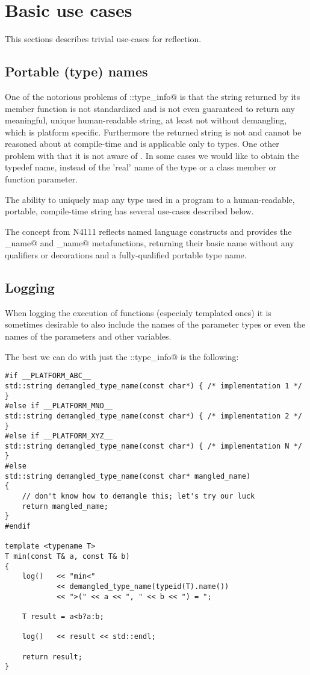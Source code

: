 \section{Basic use cases}

This sections describes trivial use-cases for reflection.

\subsection{Portable (type) names}

One of the notorious problems of \verb@std::type_info@ is that the string
returned by its \verb@name@ member function is not standardized and is
not even guaranteed to return any meaningful, unique human-readable string,
at least not without demangling, which is platform specific.
Furthermore the returned string is not \verb@constexpr@ and cannot be
reasoned about at compile-time and is applicable only to types.
One other problem with \verb@typeid@ that it is not aware of \verb@typedef@s.
In some cases we would like to obtain the typedef name, instead of the
'real' name of the type or a class member or function parameter.

The ability to uniquely map any type used in a program to a human-readable,
portable, compile-time string has several use-cases described below.

The  concept from N4111 reflects named language constructs
and provides the \verb@base_name@ and \verb@full_name@ metafunctions,
returning their basic name without any qualifiers or decorations and a fully-qualified 
portable type name.

\subsection{Logging}

When logging the execution of functions (especialy templated ones) it is sometimes
desirable to also include the names of the parameter types or even the names of the parameters
and other variables.

The best we can do with just the \verb@std::type_info@ is the following:

\begin{verbatim}
#if __PLATFORM_ABC__
std::string demangled_type_name(const char*) { /* implementation 1 */ }
#else if __PLATFORM_MNO__
std::string demangled_type_name(const char*) { /* implementation 2 */ }
#else if __PLATFORM_XYZ__
std::string demangled_type_name(const char*) { /* implementation N */ }
#else
std::string demangled_type_name(const char* mangled_name)
{
	// don't know how to demangle this; let's try our luck
	return mangled_name;
}
#endif

template <typename T>
T min(const T& a, const T& b)
{
	log()   << "min<"
	        << demangled_type_name(typeid(T).name())
	        << ">(" << a << ", " << b << ") = ";

	T result = a<b?a:b;

	log()   << result << std::endl;

	return result;
}

\end{verbatim}

